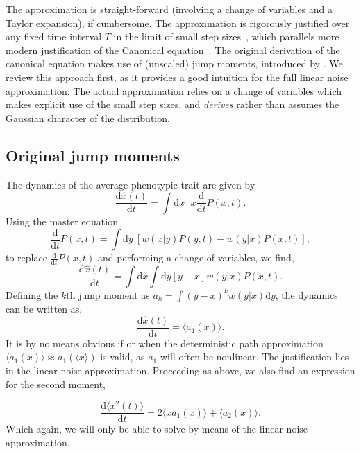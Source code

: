 The approximation is straight-forward (involving a change of variables and a Taylor expansion), if cumbersome.  The approximation is rigorously justified over any fixed time interval $T$ in the limit of small step sizes~\citep{kurtz_1971}, which parallels more modern justification of the Canonical equation~\citep{champagnat_2001}.  The original derivation of the canonical equation makes use of (unscaled) jump moments, introduced by \citet{vankampen_book2001}.  We review this approach first, as it provides a good intuition for the full linear noise approximation.  The actual approximation relies on a change of variables which makes explicit use of the small step sizes, and \emph{derives} rather than assumes the Gaussian character of the distribution.  
\subsection{Original jump moments}
The dynamics of the average phenotypic trait are given by
\begin{equation}
	\frac{\mathrm{d} \hat x(t)}{\mathrm{d} t} = \int \mathrm{d} x \phantom \cdot x \frac{\mathrm{d}}{\mathrm{d} t} P(x,t).
\end{equation}
Using the master equation
\begin{equation}
\frac{\mathrm{d}}{\mathrm{d} t} P(x, t) = \int \mathrm{d} y\  \left[ w(x|y)P(y, t) - w(y|x) P(x,t)\right],
\end{equation}
to replace $\tfrac{\mathrm{d}}{\mathrm{d} t} P(x,t)$ and performing a change of variables, we find,
\begin{equation}
	\frac{\mathrm{d} \hat x(t)}{\mathrm{d} t} = \int \mathrm{d} x \int \mathrm{d} y [y-x] w(y|x)P(x,t).
\end{equation}
Defining the $k$th jump moment as $a_k = \int (y-x)^k w(y|x) \mathrm{d} y$, the dynamics can be written as,
\begin{equation}
	\frac{\mathrm{d} \hat x(t)}{\mathrm{d} t} = \langle a_1(x) \rangle . \label{exact1}
\end{equation}
It is by no means obvious if or when the deterministic path approximation $\langle a_1(x) \rangle \approx a_1(\langle x \rangle )$ is valid, as $a_1$ will often be nonlinear.  The justification lies in the linear noise approximation.  Proceeding as above, we also find an expression for the second moment,  
 
\begin{equation}
	\frac{\mathrm{d} \langle x^2(t) \rangle }{\mathrm{d} t} = 2\langle x a_1(x) \rangle + \langle a_2(x) \rangle \label{exact2} . 
\end{equation}
Which again, we will only be able to solve by means of the linear noise approximation.   
